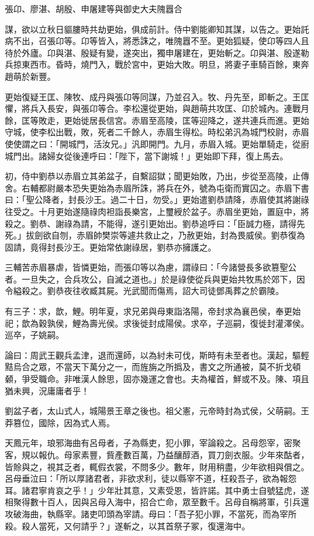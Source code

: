 \begin{pinyinscope}
張卬、廖湛、胡殷、申屠建等與御史大夫隗囂合

謀，欲以立秋日貙膢時共劫更始，俱成前計。侍中劉能卿知其謀，以告之。更始託病不出，召張卬等。卬等皆入，將悉誅之，唯隗囂不至。更始狐疑，使卬等四人且待於外廬。卬與湛、殷疑有變，遂突出，獨申屠建在，更始斬之。卬與湛、殷遂勒兵掠東西市。昏時，燒門入，戰於宮中，更始大敗。明旦，將妻子車騎百餘，東奔趙萌於新豐。

更始復疑王匡、陳牧、成丹與張卬等同謀，乃並召入。牧、丹先至，即斬之。王匡懼，將兵入長安，與張卬等合。李松還從更始，與趙萌共攻匡、卬於城內。連戰月餘，匡等敗走，更始徙居長信宮。赤眉至高陵，匡等迎降之，遂共連兵而進。更始守城，使李松出戰，敗，死者二千餘人，赤眉生得松。時松弟汎為城門校尉，赤眉使使謂之曰：「開城門，活汝兄。」汎即開門。九月，赤眉入城。更始單騎走，從廚城門出。諸婦女從後連呼曰：「陛下，當下謝城！」更始即下拜，復上馬去。

初，侍中劉恭以赤眉立其弟盆子，自繫詔獄；聞更始敗，乃出，步從至高陵，止傳舍。右輔都尉嚴本恐失更始為赤眉所誅，將兵在外，號為屯衛而實囚之。赤眉下書曰：「聖公降者，封長沙王。過二十日，勿受。」更始遣劉恭請降，赤眉使其將謝祿往受之。十月更始遂隨祿肉袒詣長樂宮，上璽綬於盆子。赤眉坐更始，置庭中，將殺之。劉恭、謝祿為請，不能得，遂引更始出。劉恭追呼曰：「臣誠力極，請得先死。」拔劍欲自刎，赤眉帥樊崇等遽共救止之，乃赦更始，封為畏威侯。劉恭復為固請，竟得封長沙王。更始常依謝祿居，劉恭亦擁護之。

三輔苦赤眉暴虐，皆憐更始，而張卬等以為慮，謂祿曰：「今諸營長多欲篡聖公者。一旦失之，合兵攻公，自滅之道也。」於是祿使從兵與更始共牧馬於郊下，因令縊殺之。劉恭夜往收臧其屍。光武聞而傷焉，詔大司徒鄧禹葬之於霸陵。

有三子：求，歆，鯉。明年夏，求兄弟與母東詣洛陽，帝封求為襄邑侯，奉更始祀；歆為穀孰侯，鯉為壽光侯。求後徙封成陽侯。求卒，子巡嗣，復徙封灌澤侯。巡卒，子姚嗣。

論曰：周武王觀兵孟津，退而還師，以為紂未可伐，斯時有未至者也。漢起，驅輕黠烏合之眾，不當天下萬分之一，而旌旃之所撝及，書文之所通被，莫不折戈頓顙，爭受職命。非唯漢人餘思，固亦幾運之會也。夫為權首，鮮或不及。陳、項且猶未興，況庸庸者乎！

劉盆子者，太山式人，城陽景王章之後也。祖父憲，元帝時封為式侯，父萌嗣。王莽篡位，國除，因為式人焉。

天鳳元年，琅邪海曲有呂母者，子為縣吏，犯小罪，宰論殺之。呂母怨宰，密聚客，規以報仇。母家素豐，貲產數百萬，乃益釀醇酒，買刀劍衣服。少年來酤者，皆賒與之，視其乏者，輒假衣裳，不問多少。數年，財用稍盡，少年欲相與償之。呂母垂泣曰：「所以厚諸君者，非欲求利，徒以縣宰不道，枉殺吾子，欲為報怨耳。諸君寧肯哀之乎！」少年壯其意，又素受恩，皆許諾。其中勇士自號猛虎，遂相聚得數十百人，因與呂母入海中，招合亡命，眾至數千。呂母自稱將軍，引兵還攻破海曲，執縣宰。諸吏叩頭為宰請。母曰：「吾子犯小罪，不當死，而為宰所殺。殺人當死，又何請乎？」遂斬之，以其首祭子冢，復還海中。


\end{pinyinscope}
